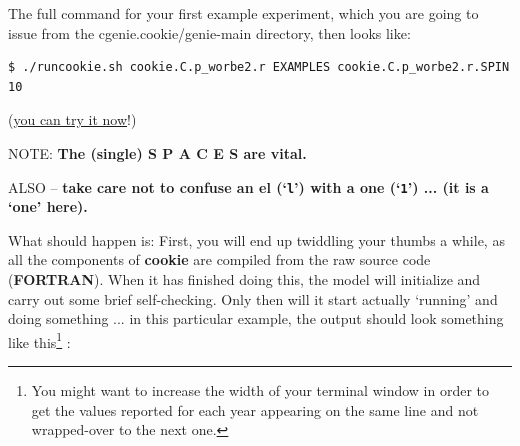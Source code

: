 \vspace{1mm}
\noindent The full command for your first example experiment, which you are going to issue from the \textsf{\footnotesize cgenie.cookie/genie-main} directory, then looks like:

\vspace{-1mm}\begin{verbatim}
$ ./runcookie.sh cookie.C.p_worbe2.r EXAMPLES cookie.C.p_worbe2.r.SPIN 10
\end{verbatim}\vspace{-1mm}

\noindent(\uline{you can try it now}!)

\vspace{2mm}
\noindent NOTE: \textbf{The (single) S P A C E S are vital. }

\noindent ALSO -- \textbf{take care not to confuse an el (‘\texttt{l}’) with a one (‘\texttt{1}’)  ... (it is a ‘one’ here).}

\newpage

\noindent What should happen is: First, you will end up twiddling your thumbs a while, as all the components of \textbf{cookie} are compiled from the raw source code (\textbf{FORTRAN}). When it has finished doing this, the model will initialize and carry out some brief self-checking. Only then will it start actually ‘running’ and doing something ... in this particular example, the output should look something like this\footnote{You might want to increase the width of your terminal window in order to get the values reported for each year appearing on the same line and not wrapped-over to the next one.} :

